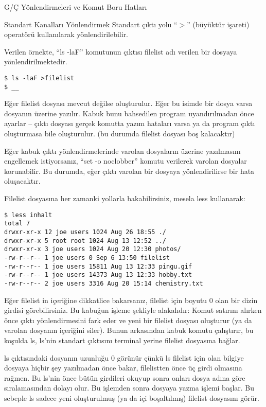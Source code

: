 \begin{section}{G/Ç Yönlendirmeleri ve Komut Boru Hatları}
\begin{subsection}{Standart Kanalları Yönlendirmek}
Standart çıktı yolu “$>$” (büyüktür işareti) operatörü kullanılarak yönlendirilebilir.

Verilen örnekte, “ls -laF” komutunun çıktısı filelist adı verilen bir  dosyaya yönlendirilmektedir.
\begin{verbatim}
$ ls -laF >filelist 
$ __
\end{verbatim}

Eğer filelist dosyası mevcut değilse oluşturulur. Eğer bu isimde bir dosya varsa dosyanın üzerine yazılır. Kabuk bunu bahsedilen program uyandırılmadan önce ayarlar – çıktı dosyası gerçek komutta yazım hataları varsa ya da program çıktı oluşturmasa bile oluşturulur. (bu durumda filelist dosyası boş kalacaktır)

Eğer kabuk çıktı yönlendirmelerinde varolan dosyaların üzerine yazılmasını engellemek istiyorsanız, “set -o noclobber” komutu verilerek varolan dosyalar korunabilir. Bu durumda, eğer çıktı varolan bir dosyaya yönlendirilirse bir hata oluşacaktır.

Filelist dosyasına her zamanki yollarla bakabilirsiniz, mesela less kullanarak:
\begin{verbatim}
$ less inhalt 
total 7 
drwxr-xr-x 12 joe users 1024 Aug 26 18:55 ./
drwxr-xr-x 5 root root 1024 Aug 13 12:52 ../
drwxr-xr-x 3 joe users 1024 Aug 20 12:30 photos/
-rw-r--r-- 1 joe users 0 Sep 6 13:50 filelist
-rw-r--r-- 1 joe users 15811 Aug 13 12:33 pingu.gif
-rw-r--r-- 1 joe users 14373 Aug 13 12:33 hobby.txt
-rw-r--r-- 2 joe users 3316 Aug 20 15:14 chemistry.txt
\end{verbatim}

Eğer filelist in içeriğine dikkatlice bakarsanız, filelist için boyutu 0 olan bir dizin girdisi görebilirsiniz. Bu kabuğun işleme şekliyle alakalıdır: Komut satırını alırken önce çıktı yönlendirmesini fark eder ve yeni bir filelist dosyası oluşturur (ya da varolan dosyanın içeriğini siler). Bunun arkasından kabuk komutu çalıştırır, bu koşulda ls, ls'nin standart çıktısını terminal yerine filelist dosyasına bağlar. 

ls çıktısındaki dosyanın uzunluğu 0 görünür çünkü ls filelist için olan bilgiye dosyaya hiçbir şey yazılmadan önce bakar, filelistten önce üç girdi olmasına rağmen. Bu ls'nin önce bütün girdileri okuyup sonra onları dosya adına göre sıralamasından dolayı olur. Bu işlemden sonra dosyaya yazma işlemi başlar. Bu sebeple ls sadece yeni oluşturulmuş (ya da içi boşaltılmış) filelist dosyasını görür.


\end{subsection}
\end{section}
